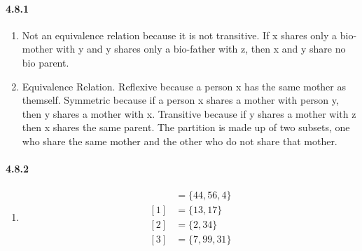 \documentclass[11pt, letterpaper, twocolumn, fleqn]{article}
\begin{document}
    \paragraph{4.8.1}
        \begin{enumerate}
            \item Not an equivalence relation because it is not transitive. If x shares only a bio-mother with y and y shares only a bio-father with z, then x and y share no bio parent.
            \item Equivalence Relation. Reflexive because a person x has the same mother as themself. Symmetric because if a person x shares a mother with person y, then y shares a mother with x. Transitive because if y shares a mother with z then x shares the same parent.
            \newline The partition is made up of two subsets, one who share the same mother and the other who do not share that mother.
        \end{enumerate}
    
    \paragraph{4.8.2}
        \begin{enumerate}
            \item 
                \begin{align*}
                 [0] &= \{44,56,4\} \\
                 [1] &= \{13,17\} \\
                 [2] &= \{2,34\} \\
                 [3] &= \{7,99,31\}
                \end{align*}
        \end{enumerate}
    
\end{document}
